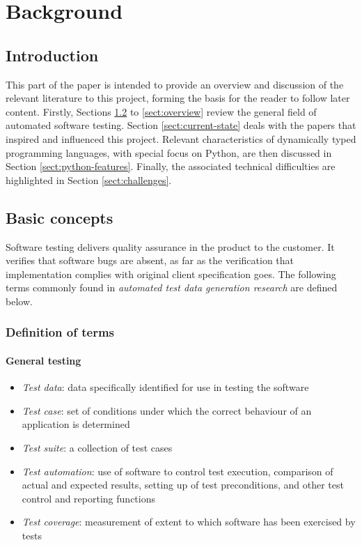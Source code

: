 \documentclass{icldt}
\numberwithin{equation}{section}       %
\begin{document}
\chapter{Background}
\label{ch:background}
\section{Introduction}
This part of the paper is intended to provide an overview and discussion of the relevant literature to this project, forming the basis for the reader to follow later content. Firstly, Sections \ref{sect:basics} to \ref{sect:overview} review the general field of automated software testing. Section \ref{sect:current-state} deals with the papers that inspired and influenced this project. Relevant characteristics of dynamically typed programming languages, with special focus on Python, are then discussed in Section \ref{sect:python-features}. Finally, the associated technical difficulties are highlighted in Section \ref{sect:challenges}.
\section{Basic concepts}
\label{sect:basics}
Software testing delivers quality assurance in the product to the customer. It verifies that software bugs are absent, as far as the verification that implementation complies with original client specification goes. The following terms commonly found in \emph{automated test data generation research} are defined below.

\subsection{Definition of terms}
\subsubsection{General testing}
\begin{itemize}
	\item \emph{Test data}: data specifically identified for use in testing the software
	\item \emph{Test case}: set of conditions under which the correct behaviour of an application is determined
	\item \emph{Test suite}: a collection of test cases
	\item \emph{Test automation}: use of software to control test execution, comparison of actual and expected results, setting up of test preconditions, and other test control and reporting functions
	\item \emph{Test coverage}: measurement of extent to which software has been exercised by tests
\end{itemize}
\end{document}
